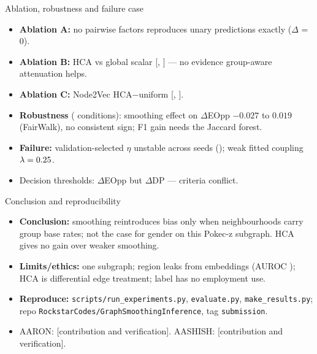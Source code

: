 \documentclass[aspectratio=169,11pt]{beamer}
\begin{document}
\begin{frame}{Ablation, robustness and failure case}
\begin{itemize}
\item \textbf{Ablation A:} no pairwise factors reproduces unary predictions exactly ($\Delta$ = 0).
\item \textbf{Ablation B:} HCA vs global scalar \RHfourEst{} [\RHfourLo, \RHfourHi] --- no evidence group-aware attenuation helps.
\item \textbf{Ablation C:} Node2Vec HCA$-$uniform \REthreeDeoppG{} [\REthreeDeoppGLo, \REthreeDeoppGHi].
\item \textbf{Robustness} (\RRobConditions{} conditions): smoothing effect on $\Delta$EOpp $-0.027$ to $0.019$ (FairWalk), no consistent sign; F1 gain needs the Jaccard forest.
\item \textbf{Failure:} validation-selected $\eta$ unstable across seeds (\REtaFwList); weak fitted coupling $\lambda=0.25$.
\item Decision thresholds: $\Delta$EOpp \RNVThrDeoppG{} but $\Delta$DP \RNVThrDdpG{} --- criteria conflict.
\end{itemize}
\end{frame}

\begin{frame}{Conclusion and reproducibility}
\begin{itemize}
\item \textbf{Conclusion:} smoothing reintroduces bias only when neighbourhoods carry group base rates; not the case for gender on this Pokec-z subgraph. HCA gives no gain over weaker smoothing.
\item \textbf{Limits/ethics:} one subgraph; region leaks from embeddings (AUROC \RSensNVRegion); HCA is differential edge treatment; label has no employment use.
\item \textbf{Reproduce:} \texttt{scripts/run\_experiments.py}, \texttt{evaluate.py}, \texttt{make\_results.py}; repo \texttt{RockstarCodes/GraphSmoothingInference}, tag \texttt{submission}.
\item AARON: [contribution and verification]. AASHISH: [contribution and verification].
\end{itemize}
\end{frame}
\end{document}

